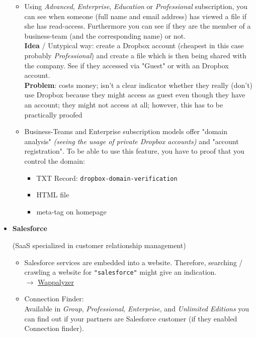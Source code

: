 \documentclass[12pt]{article}
\begin{document}
\begin{itemize}
    \begin{itemize}
        \item Using \textit{Advanced}, \textit{Enterprise}, \textit{Education} or \textit{Professional} subscription, you can see when someone (full name and email address) has viewed a file if she has read-access. Furthermore you can see if they are the member of a business-team (and the corresponding name) or not. \\
        \textbf{Idea} / Untypical way: create a Dropbox account (cheapest in this case probably \textit{Professional}) and create a file which is then being shared with the company. See if they accessed via "Guest" or with an Dropbox account. \\
        \textbf{Problem}: costs money; isn't a clear indicator whether they really (don't) use Dropbox because they might access as guest even though they have an account; they might not access at all; however, this has to be practically proofed
        
        \item Business-Teams and Enterprise subscription models offer "domain analysis" \textit{(seeing the usage of private Dropbox accounts)} and "account registration". To be able to use this feature, you have to proof that you control the domain:
        \begin{itemize}
            \item TXT Record: \verb|dropbox-domain-verification|
            \item HTML file
            \item meta-tag on homepage
        \end{itemize}
    \end{itemize}
    
    
    \item \textbf{Salesforce}
    
    (SaaS specialized in customer relationship management)
    
    \begin{itemize}
        \item Salesforce services are embedded into a website. Therefore, searching / crawling a website for \verb|"salesforce"| might give an indication. \\
        $\rightarrow$ \href{https://www.wappalyzer.com/lists/?technologies=salesforce}{Wappalyzer}
        
        \item Connection Finder: \\
        Available in \textit{Group}, \textit{Professional}, \textit{Enterprise}, and \textit{Unlimited Editions} you can find out if your partners are Salesforce customer (if they enabled Connection finder).
    \end{itemize}
    

\end{itemize}
\end{document}
